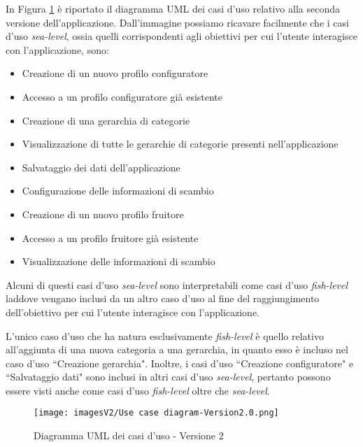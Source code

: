 In Figura \ref{fig:Use Case 2} è riportato il diagramma UML dei casi d'uso relativo alla seconda versione dell'applicazione. Dall'immagine possiamo ricavare facilmente che i casi d'uso \textit{sea-level}, ossia quelli corrispondenti agli obiettivi per cui l'utente interagisce con l'applicazione, sono:
\begin{itemize}
    \item Creazione di un nuovo profilo configuratore 
    \item Accesso a un profilo configuratore già esistente
    \item Creazione di una gerarchia di categorie
    \item Visualizzazione di tutte le gerarchie di categorie presenti nell'applicazione
    \item Salvataggio dei dati dell'applicazione
    \item Configurazione delle informazioni di scambio
    \item Creazione di un nuovo profilo fruitore
    \item Accesso a un profilo fruitore già esistente
    \item Visualizzazione delle informazioni di scambio
\end{itemize}
Alcuni di questi casi d'uso \textit{sea-level} sono interpretabili come casi d'uso \textit{fish-level} laddove vengano inclusi da un altro caso d'uso al fine del raggiungimento dell'obiettivo per cui l'utente interagisce con l'applicazione.

L'unico caso d'uso che ha natura esclusivamente \textit{fish-level} è quello relativo all'aggiunta di una nuova categoria a una gerarchia, in quanto esso è incluso nel caso d'uso ``Creazione gerarchia". Inoltre, i casi d'uso ``Creazione configuratore" e ``Salvataggio dati" sono inclusi in altri casi d'uso \textit{sea-level}, pertanto possono essere visti anche come casi d'uso \textit{fish-level} oltre che \textit{sea-level}.

\begin{figure}
\centering
\texttt{[image: imagesV2/Use case diagram-Version2.0.png]}
\caption{\label{fig:Use Case 2}Diagramma UML dei casi d'uso - Versione 2}
\end{figure}\bigskip